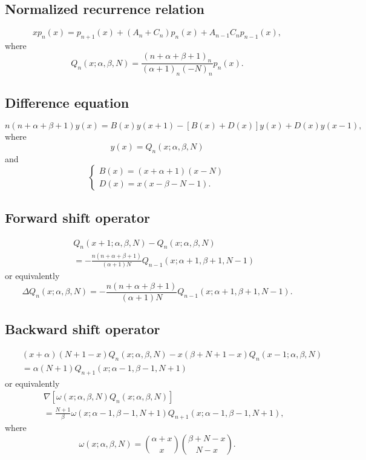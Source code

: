 \documentclass[envcountchap,graybox]{svmono}
\begin{document}
\subsection*{Normalized recurrence relation}
\begin{equation}
\label{NormRecHahn}
xp_n(x)=p_{n+1}(x)+\left(A_n+C_n\right)p_n(x)+A_{n-1}C_np_{n-1}(x),
\end{equation}
where
$$Q_n(x;\alpha,\beta,N)=\frac{(n+\alpha+\beta+1)_n}{(\alpha+1)_n(-N)_n}p_n(x).$$

\subsection*{Difference equation}
\begin{equation}
\label{dvHahn}
n(n+\alpha+\beta+1)y(x)=B(x)y(x+1)-\left[B(x)+D(x)\right]y(x)+D(x)y(x-1),
\end{equation}
where
$$y(x)=Q_n(x;\alpha,\beta,N)$$
and
$$\left\{\begin{array}{l}
\displaystyle B(x)=(x+\alpha+1)(x-N)\\[5mm]
\displaystyle D(x)=x(x-\beta-N-1).
\end{array}\right.$$

\subsection*{Forward shift operator}
\begin{eqnarray}
\label{shift1HahnI}
& &Q_n(x+1;\alpha,\beta,N)-Q_n(x;\alpha,\beta,N)\nonumber\\
& &{}=-\frac{n(n+\alpha+\beta+1)}{(\alpha+1)N}Q_{n-1}(x;\alpha+1,\beta+1,N-1)
\end{eqnarray}
or equivalently
\begin{equation}
\label{shift1HahnII}
\Delta Q_n(x;\alpha,\beta,N)=-\frac{n(n+\alpha+\beta+1)}{(\alpha+1)N}Q_{n-1}(x;\alpha+1,\beta+1,N-1).
\end{equation}

\subsection*{Backward shift operator}
\begin{eqnarray}
\label{shift2HahnI}
& &(x+\alpha)(N+1-x)Q_n(x;\alpha,\beta,N)-x(\beta+N+1-x)Q_n(x-1;\alpha,\beta,N)\nonumber\\
& &{}=\alpha(N+1)Q_{n+1}(x;\alpha-1,\beta-1,N+1)
\end{eqnarray}
or equivalently
\begin{eqnarray}
\label{shift2HahnII}
& &\nabla\left[\omega(x;\alpha,\beta,N)Q_n(x;\alpha,\beta,N)\right]\nonumber\\
& &{}=\frac{N+1}{\beta}\omega(x;\alpha-1,\beta-1,N+1)Q_{n+1}(x;\alpha-1,\beta-1,N+1),
\end{eqnarray}
where
$$\omega(x;\alpha,\beta,N)=\binom{\alpha+x}{x}\binom{\beta+N-x}{N-x}.$$
\end{document}
